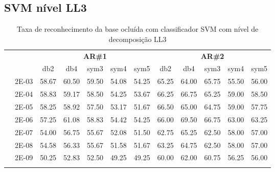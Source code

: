 \subsection{SVM nível LL3}
\begin{table}[H]
	\centering
    \normalsize
	\caption{Taxa de reconhecimento da base ocluída com classificador SVM com nível de decomposição LL3} 
	\begin{tabular}{|c|c|c c c c c|c c c c c|}
\cline{3-12}
\multicolumn{2}{c|}{\multirow{2}{*}{}} & \multicolumn{5}{c|}{\textbf{AR\#1}}  & \multicolumn{5}{c|}{\textbf{AR\#2}} \\\cline{3-12}

\multicolumn{2}{c|}{}  & db2 & db4 & sym3 & sym4 & sym5 & db2 & db4& sym3 & sym4 & sym5 \\\hline
\multicolumn{1}{|c|}{ \multirow{6}{*}{\rotatebox[origin=c]{90}{\textbf{Sigma}}} }
&2E-03&	58.67&	60.50&	59.50&	54.08&	54.25&	65.25&	64.00&	65.75&	55.50&	56.00	\\\cline{2-12}
&2E-04&	58.83&	59.17&	58.50&	54.25&	53.67&	66.25&	66.75&	65.25&	59.00&	58.50	\\\cline{2-12}
&2E-05&	58.25&	58.92&	57.50&	53.17&	51.67&	66.50&	65.00&	64.75&	59.00&	57.75	\\\cline{2-12}
&2E-06&	57.25&	61.08&	58.83&	54.42&	54.25&	66.00&	69.50&	66.75&	63.00&	63.25	\\\cline{2-12}
&2E-07&	54.00&	56.75&	55.67&	52.08&	51.50&	62.75&	65.25&	62.50&	58.00&	57.00	\\\cline{2-12}
&2E-08&	54.58&	56.33&	55.67&	51.58&	51.67&	63.25&	64.75&	62.50&	58.00&	57.00	\\\cline{2-12}
&2E-09&	50.25&	52.83&	52.50&	49.25&	49.25&	60.00&	62.00&	60.75&	56.25&	56.00	



\\ \midrule
\multicolumn{12}{c}{}\\ 


\end{tabular}
\end{table}
